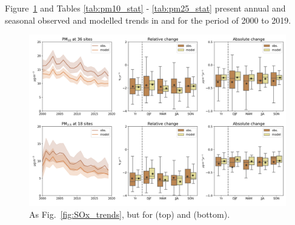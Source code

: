 Figure~\ref{fig:pm_trends} and Tables \ref{tab:pm10_stat} - \ref{tab:pm25_stat} present annual and seasonal observed and modelled trends in \PM[10] and \PM[2.5] for the period of 2000 to 2019. 


\begin{figure}[h]
	\centering
	\includegraphics[width=0.74\paperwidth]{FIGS_TRENDS/PM_trends.png}
	\caption{\label{fig:pm_trends}
		As Fig.~\ref{fig:SOx_trends}, but for \pmten (top) and \pmfine (bottom).}
\end{figure}


